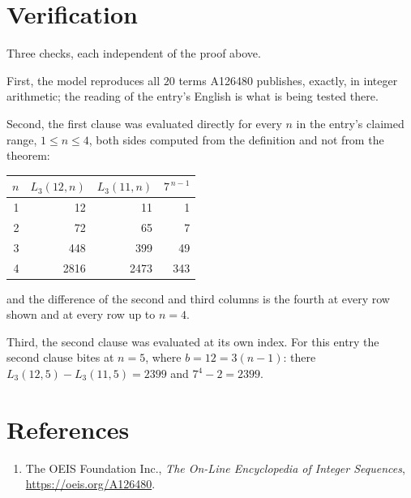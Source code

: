 \documentclass[11pt,a4paper]{article}
\theoremstyle{plain}
\theoremstyle{definition}
\begin{document}
\section{Verification}

Three checks, each independent of the proof above.

First, the model reproduces all $20$ terms A126480 publishes, exactly, in integer
arithmetic; the reading of the entry's English is what is being tested there.

Second, the first clause was evaluated directly for every $n$ in the entry's claimed range,
$1\le n\le4$, both sides computed from the definition and not from the theorem:

\begin{center}
\begin{tabular}{rrrr}
$n$ & $L_{3}(12,n)$ & $L_{3}(11,n)$ & $7^{\,n-1}$ \\ \hline
1 & 12 & 11 & 1 \\
2 & 72 & 65 & 7 \\
3 & 448 & 399 & 49 \\
4 & 2816 & 2473 & 343 \\
\end{tabular}
\end{center}

\noindent and the difference of the second and third columns is the fourth at every row shown
and at every row up to $n=4$.

Third, the second clause was evaluated at its own index. For this entry the second clause bites at $n=5$, where $b=12=3(n-1)$: there $L_{3}(12,5)-L_{3}(11,5)=2399$ and $7^{4}-2=2399$.

\section*{References}
\begin{enumerate}
\item The OEIS Foundation Inc., \emph{The On-Line Encyclopedia of Integer Sequences},
\url{https://oeis.org/A126480}.
\end{enumerate}
\end{document}
